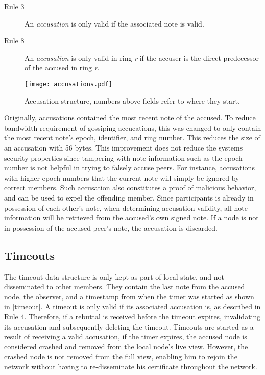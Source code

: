\documentclass[USenglish]{uit-thesis}
\begin{document}
\begin{description}
	\item[Rule 3] An \textit{accusation} is only valid if the associated note is valid.
	\item[Rule 8] An \textit{accusation} is only valid in ring \textit{r} if the accuser is the direct predecessor of the accused in ring \textit{r}.
\end{description} 

\begin{figure}[h]
	\centering
	\texttt{[image: accusations.pdf]}
	\caption[Accusation structure.]{Accusation structure, numbers above fields refer to where they start.}
	\label{accu}
\end{figure}
Originally, accusations contained the most recent note of the accused.
To reduce bandwidth requirement of gossiping accucations, this was changed to only contain the most recent note's epoch, identifier, and ring number.
This reduces the size of an accusation with 56 bytes.
This improvement does not reduce the systems security properties since tampering with note information such as the epoch number is not helpful in trying to falsely accuse peers.
For instance, accusations with higher epoch numbers that the current note will simply be ignored by correct members. 
Such accusation also constitutes a proof of malicious behavior, and can be used to expel the offending member. 
Since participants is already in possession of each other's note, when determining accusation validity, all note information will be retrieved from the accused's own signed note. 
If a node is not in possession of the accused peer's note, the accusation is discarded.


\subsection{Timeouts}
The timeout data structure is only kept as part of local state, and not disseminated to other members. They contain the last note from the accused node, the observer, and a timestamp from when the timer was started as shown in \autoref{timeout}.
A timeout is only valid if its associated accusation is, as described in Rule 4.
Therefore, if a rebuttal is received before the timeout expires, invalidating its accusation and subsequently deleting the timeout.
Timeouts are started as a result of receiving a valid accusation, if the timer expires, the accused node is considered crashed and removed from the local node's live view.
However, the crashed node is not removed from the full view, enabling him to rejoin the network without having to re-disseminate his certificate throughout the network.
\end{document}
